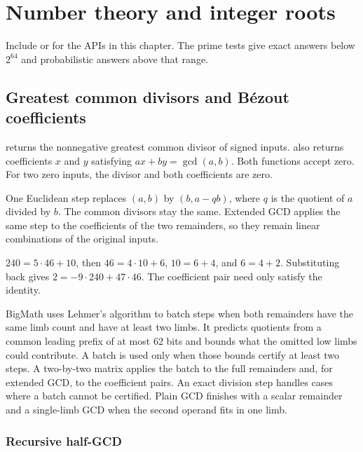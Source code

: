 \chapter{Number theory and integer roots}
\label{ch:numbertheory}

Include  or 
for the APIs in this chapter. The prime tests give exact answers below
$2^{64}$ and probabilistic answers above that range.

\section{Greatest common divisors and B\'ezout coefficients}
\label{sec:gcd}

 returns the nonnegative greatest common divisor of signed inputs.
 also returns coefficients $x$ and $y$ satisfying
$a x + b y = \gcd(a,b)$. Both functions accept zero. For two zero inputs, the
divisor and both coefficients are zero.

One Euclidean step replaces $(a,b)$ by $(b,a-qb)$, where $q$ is the quotient
of $a$ divided by $b$. The common divisors stay the same. Extended GCD applies
the same step to the coefficients of the two remainders, so they remain linear
combinations of the original inputs.

\begin{example}
$240=5\cdot46+10$, then $46=4\cdot10+6$, $10=6+4$, and
$6=4+2$. Substituting back gives $2=-9\cdot240+47\cdot46$.
The coefficient pair need only satisfy the identity.
\end{example}

BigMath uses Lehmer's algorithm to batch steps when both remainders have
the same limb count and have at least two limbs. It predicts quotients from
a common leading prefix of at most 62 bits and bounds what the omitted
low limbs could contribute. A batch is used only when those bounds certify
at least two steps. A two-by-two matrix applies the batch to the full
remainders and, for extended GCD, to the coefficient pairs. An exact
division step handles cases where a batch cannot be certified. Plain GCD
finishes with a scalar remainder and a single-limb GCD when the second
operand fits in one limb.

\subsection{Recursive half-GCD}
\label{sec:halfgcd}

